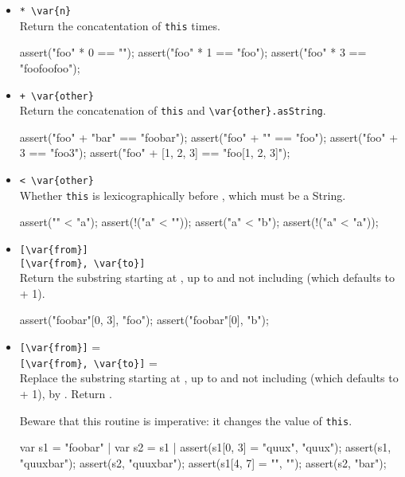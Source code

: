 \begin{itemize}
\item \lstinline|* \var{n}|\\
  Return the concatentation of \lstinline|this|  times.
\begin{urbiscript}
assert("foo" * 0 == "");
assert("foo" * 1 == "foo");
assert("foo" * 3 == "foofoofoo");
\end{urbiscript}

\item \lstinline|+ \var{other}|\\
  Return the concatenation of \lstinline|this| and
  \lstinline|\var{other}.asString|.
\begin{urbiscript}
assert("foo" + "bar" == "foobar");
assert("foo" + "" == "foo");
assert("foo" + 3 == "foo3");
assert("foo" + [1, 2, 3] == "foo[1, 2, 3]");
\end{urbiscript}

\item \lstinline|< \var{other}|\\
  Whether \lstinline|this| is lexicographically before ,
  which must be a String.
\begin{urbiscript}
assert("" < "a");
assert(!("a" < ""));
assert("a" < "b");
assert(!("a" < "a"));
\end{urbiscript}

\item \lstinline|[\var{from}]|\\
  \lstinline|[\var{from}, \var{to}]|\\
  Return the substring starting at , up to and not including
   (which defaults to  + 1).
\begin{urbiscript}
assert("foobar"[0, 3], "foo");
assert("foobar"[0], "b");
\end{urbiscript}

\item \lstinline|[\var{from}]| = \\
  \lstinline|[\var{from}, \var{to}]| = \\
  Replace the substring starting at , up to and not including
   (which defaults to  + 1), by .  Return
  .

  Beware that this routine is imperative: it changes the value of
  \lstinline|this|.
\begin{urbiscript}
var s1 = "foobar" | var s2 = s1 |
assert(s1[0, 3] = "quux", "quux");
assert(s1, "quuxbar");
assert(s2, "quuxbar");
assert(s1[4, 7] = "", "");
assert(s2, "bar");
\end{urbiscript}
\end{itemize}

